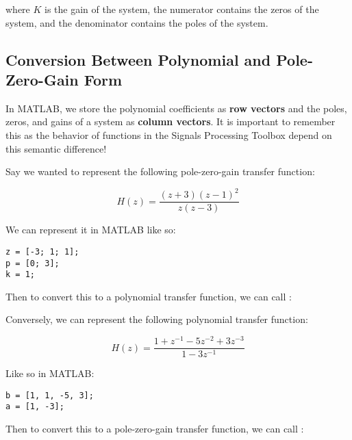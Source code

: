 \documentclass{article}
\begin{document}
where \(K\) is the gain of the system, the numerator contains the zeros
of the system, and the denominator contains the poles of the system.

\subsection{Conversion Between Polynomial and Pole-Zero-Gain Form}

In MATLAB, we store the polynomial coefficients as \textbf{row vectors}
and the poles, zeros, and gains of a system as \textbf{column vectors}.
It is important to remember this as the behavior of functions in the
Signals Processing Toolbox depend on this semantic difference!

Say we wanted to represent the following pole-zero-gain transfer
function:

\begin{equation}
	H(z)
	=
	\frac
	{(z + 3)(z - 1)^2}
	{z(z - 3)}
\end{equation}

We can represent it in MATLAB like so:

\begin{verbatim}
z = [-3; 1; 1];
p = [0; 3];
k = 1;
\end{verbatim}

Then to convert this to a polynomial transfer function, we can call
:


Conversely, we can represent the following polynomial transfer function:

\begin{equation}
	H(z)
	=
	\frac
	{1 + z^{-1} - 5z^{-2} + 3z^{-3}}
	{1 - 3z^{-1}}
\end{equation}

Like so in MATLAB:

\begin{verbatim}
b = [1, 1, -5, 3];
a = [1, -3];
\end{verbatim}

\newpage

Then to convert this to a pole-zero-gain transfer function, we can call
:

\end{document}
